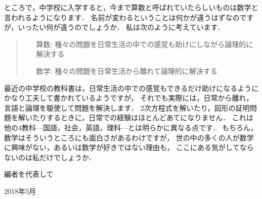 ところで，中学校に入学すると，今まで算数と呼ばれていたらしいものは数学と言われるようになります．
名前が変わるということは何かが違うはずなのですが，いったい何が違うのでしょうか．
私は次のように考えています．
\begin{quote}
\begin{itemize}
\item[算数:]種々の問題を日常生活の中での感覚も助けにしながら論理的に解決する
\item[数学:]種々の問題を日常生活から離れて論理的に解決する
\end{itemize}
\end{quote}
最近の中学校の教科書は，日常生活の中での感覚もできるだけ助けになるようにかなり工夫して書かれているようですが，
それでも実際には，日常から離れ，言語と論理を駆使して問題を解決します．
2次方程式を解いたり，図形の証明問題を解いたりするときに，日常での経験はほとんどあてになりません．
これは他の4教科---国語，社会，英語，理科---とは明らかに異なる点です．
もちろん，数学はそういうところにも面白さがあるわけですが，
世の中の多くの人が数学に興味がない，あるいは数学が好きではない理由も，
ここにある気がしてならないのは私だけでしょうか．
\begin{comment}
長々とまとまらない話をしてきましたが，そういうわけで，数学という営みは
積極的に日常から離れることを要求するものなのです．
無論，数学に出てくる様々な概念の中には，日常の中の発想から生まれたものも多くあります．
しかし，それを抽象化し，日常から切り離された論理の世界で発展させていくのが数学です．
たとえアイデアの着想に至るまでに直観の力を借りたとしても，
直観によらない強靭な思考を駆使し，そのアイデアをきちんと数学に昇華させなければ，
せっかくの発想も日の目を見ることは無いでしょう．

...と，ここまで書いてみましたが，数学がどんなものなのか，少しでもわかった気になっていただけたでしょうか．
読む人にもよるかと思いますが，私の試みがうまくいったという方が多くいらっしゃることを期待します．

さて，本書の内容は，いずれも執筆者の個性溢れる「数学」となっています．
必ずしも数学を専門としない方向けに書かれているとはいえ，
もしかすると少しばかり日常を離れなければならないかもしれません．
私たちの数学が，少しでも皆さんの「非日常」に貢献できることを願っています．

最後に，本書の製作にあたって執筆や印刷，製本に協力してくれたすべての方々，
そして本書をお読みくださっているすべての皆さまに感謝いたします．
\end{comment}
\begin{flushright}
編者を代表して

2018年5月
\end{flushright}